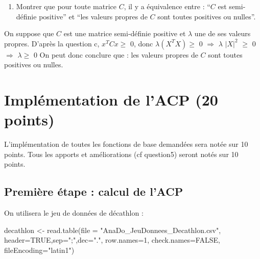 \documentclass[
]{article}
\newenvironment{Shaded}{\begin{snugshade}}{\end{snugshade}}
\newcommand{\AttributeTok}[1]{\textcolor[rgb]{0.77,0.63,0.00}{#1}}
\newcommand{\ConstantTok}[1]{\textcolor[rgb]{0.00,0.00,0.00}{#1}}
\newcommand{\DecValTok}[1]{\textcolor[rgb]{0.00,0.00,0.81}{#1}}
\newcommand{\FunctionTok}[1]{\textcolor[rgb]{0.00,0.00,0.00}{#1}}
\newcommand{\NormalTok}[1]{#1}
\newcommand{\OtherTok}[1]{\textcolor[rgb]{0.56,0.35,0.01}{#1}}
\newcommand{\StringTok}[1]{\textcolor[rgb]{0.31,0.60,0.02}{#1}}
\providecommand{\tightlist}{%
  \setlength{\itemsep}{0pt}\setlength{\parskip}{0pt}}
\begin{document}
\begin{enumerate}
\def\labelenumi{\alph{enumi}.}
\setcounter{enumi}{3}
\tightlist
\item
  Montrer que pour toute matrice \(C\), il y a équivalence entre :
  ``\(C\) est semi-définie positive'' et ``les valeurs propres de \(C\)
  sont toutes positives ou nulles''.
\end{enumerate}

On suppose que \(C\) est une matrice semi-définie positive et
\(\lambda\) une de ses valeurs propres. \newline D'après la question c,
\(x^TCx \ge\) 0, donc \(\lambda (X^TX) \ge\) 0 \(\Rightarrow\)
\(\lambda\) \(|X|^2\) \(\ge\) 0 \(\Rightarrow\) \(\lambda \ge\) 0
\newline On peut donc conclure que : les valeurs propres de \(C\) sont
toutes positives ou nulles.

\hypertarget{impluxe9mentation-de-lacp-20-points}{%
\section{Implémentation de l'ACP (20
points)}\label{impluxe9mentation-de-lacp-20-points}}

L'implémentation de toutes les fonctions de base demandées sera notée
sur 10 points. Tous les apports et améliorations (cf question5) seront
notés sur 10 points.

\hypertarget{premiuxe8re-uxe9tape-calcul-de-lacp}{%
\subsection{Première étape : calcul de
l'ACP}\label{premiuxe8re-uxe9tape-calcul-de-lacp}}

On utilisera le jeu de données de décathlon :

\begin{Shaded}
\begin{Highlighting}[]
\NormalTok{decathlon }\OtherTok{\textless{}{-}} \FunctionTok{read.table}\NormalTok{(}\AttributeTok{file =} \StringTok{"AnaDo\_JeuDonnees\_Decathlon.csv"}\NormalTok{, }
                        \AttributeTok{header=}\ConstantTok{TRUE}\NormalTok{,}\AttributeTok{sep=}\StringTok{";"}\NormalTok{,}\AttributeTok{dec=}\StringTok{"."}\NormalTok{, }\AttributeTok{row.names=}\DecValTok{1}\NormalTok{, }
                        \AttributeTok{check.names=}\ConstantTok{FALSE}\NormalTok{, }\AttributeTok{fileEncoding=}\StringTok{"latin1"}\NormalTok{)}
\end{Highlighting}
\end{Shaded}
\end{document}
